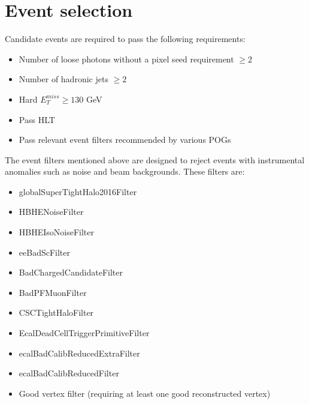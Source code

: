 \section{Event selection}
Candidate events are required to pass the following requirements:
\begin{itemize}
	\item Number of loose photons without a pixel seed requirement $\geq 2$
	\item Number of hadronic jets $\geq 2$
	\item Hard $E_T^{miss} \geq 130$ GeV
	\item Pass HLT
	\item Pass relevant event filters recommended by various POGs
\end{itemize}
The event filters mentioned above are designed to reject events with instrumental anomalies such as noise and beam backgrounds.  These filters are:
\begin{itemize}
	\item globalSuperTightHalo2016Filter
	\item HBHENoiseFilter
	\item HBHEIsoNoiseFilter
	\item eeBadScFilter
	\item BadChargedCandidateFilter
	\item BadPFMuonFilter
	\item CSCTightHaloFilter
	\item EcalDeadCellTriggerPrimitiveFilter
	\item ecalBadCalibReducedExtraFilter
	\item ecalBadCalibReducedFilter
	\item Good vertex filter (requiring at least one good reconstructed vertex)
\end{itemize}

